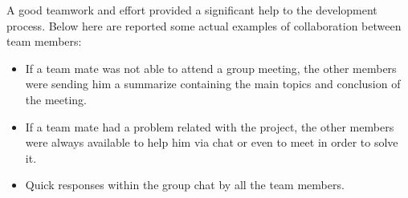 A good teamwork and effort provided a significant help to the development process. Below here are reported some actual examples of collaboration between team members:
\begin{itemize}

\item If a team mate was not able to attend a group meeting, the other members were sending him a summarize containing the main topics and conclusion of the meeting.
\item If a team mate had a problem related with the project, the other members were always available to help him via chat or even to meet in order to solve it.
\item Quick responses within the group chat by all the team members.
\end{itemize}





